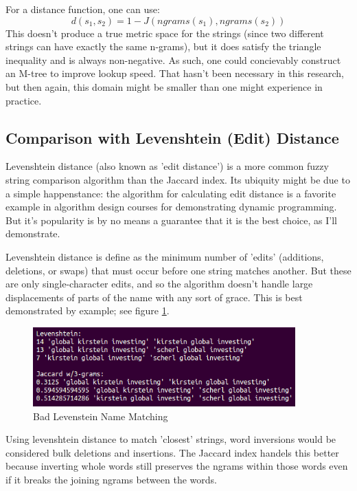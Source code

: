 \documentclass[11pt]{article}
\begin{document}
For a distance function, one can use:
\[d(s_1,s_2) = 1-J(ngrams(s_1),ngrams(s_2))\]
This doesn't produce a true metric space for the strings
(since two different strings can have exactly the same n-grams), but it does satisfy
the triangle inequality \cite{general} and is always non-negative. As such, one could
concievably construct an M-tree \cite{mtree} to improve lookup speed. That hasn't been necessary
in this research, but then again, this domain might be smaller than one might experience in
practice.

\subsection{Comparison with Levenshtein (Edit) Distance}
Levenshtein distance (also known as 'edit distance') is a more common fuzzy string comparison algorithm
than the Jaccard index. 
Its ubiquity might be due to a simple happenstance: the algorithm for calculating edit distance is
a favorite example in algorithm design courses for demonstrating dynamic programming.
But it's popularity is by no means a guarantee that it is the best choice, as I'll demonstrate.

Levenshtein distance is define as \cite{levenshtein} the minimum number of 'edits' 
(additions, deletions, or swaps) that must occur before one string matches another.
But these are only single-character edits, and so the algorithm doesn't handle large displacements
of parts of the name with any sort of grace.
This is best demonstrated by example; see figure \ref{fig:lev_comp}.

\begin{figure}[h!]
    \centering
    \includegraphics[width=0.9\textwidth,natwidth=1,natheight=1]{levenshtein_comp.png}
    \caption{Bad Levenstein Name Matching}
    \label{fig:lev_comp}
\end{figure}

Using levenshtein distance to match 'closest' strings, word 
inversions would be considered bulk deletions and insertions. 
The Jaccard index handels this better because inverting whole words 
still preserves the ngrams within those words even if it breaks
the joining ngrams between the words.
\end{document}
